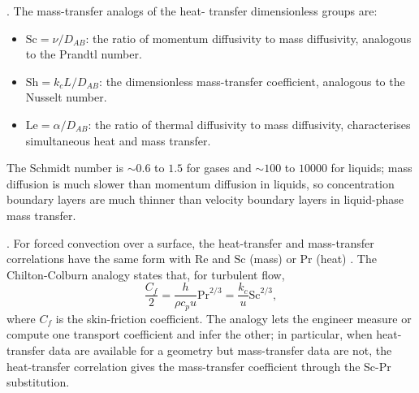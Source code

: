 . The mass-transfer analogs of the heat-
transfer dimensionless groups are:
\begin{itemize}[leftmargin=*]
  \item {} $\text{Sc} = \nu/D_{AB}$: the ratio
    of momentum diffusivity to mass diffusivity, analogous to the
    Prandtl number.
  \item {} $\text{Sh} = k_c L/D_{AB}$: the
    dimensionless mass-transfer coefficient, analogous to the
    Nusselt number.
  \item {} $\text{Le} = \alpha/D_{AB}$: the ratio
    of thermal diffusivity to mass diffusivity, characterises
    simultaneous heat and mass transfer.
\end{itemize}

The Schmidt number is $\sim 0.6$ to $1.5$ for gases and $\sim 100$
to $10000$ for liquids; mass diffusion is much slower than momentum
diffusion in liquids, so concentration boundary layers are much
thinner than velocity boundary layers in liquid-phase mass transfer.



. For forced convection over a
surface, the heat-transfer and mass-transfer correlations have the
same form with $\text{Re}$ and $\text{Sc}$ (mass) or $\text{Pr}$ (heat)
\cite{text:bird-transport-phenomena}. The Chilton-Colburn analogy
states that, for turbulent flow,
\[
\frac{C_f}{2} = \frac{h}{\rho c_p u} \text{Pr}^{2/3} = \frac{k_c}{u}
\text{Sc}^{2/3},
\]
where $C_f$ is the skin-friction coefficient. The analogy lets the
engineer measure or compute one transport coefficient and infer the
other; in particular, when heat-transfer data are available for a
geometry but mass-transfer data are not, the heat-transfer correlation
gives the mass-transfer coefficient through the Sc-Pr substitution.

